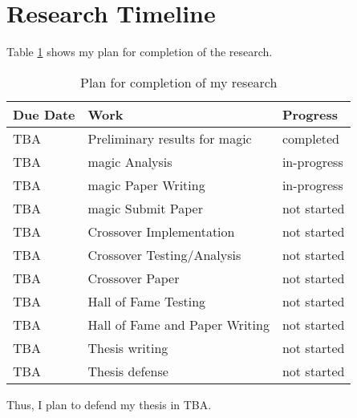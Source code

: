\section{Research Timeline}
\label{timeline}

Table \ref{tab:timeline} shows my plan for completion of the research.

\begin{table}[h]
	\begin{small}
		\begin{center}
			\begin{tabular}{lll}
				Due Date 		& Work 					& Progress\\
				\hline
				TBA 		& Preliminary results for magic & completed\\
				TBA 		& magic Analysis 	& in-progress\\
				TBA 	& magic Paper Writing & in-progress\\
				TBA 	& magic Submit Paper & not started\\
				TBA 	& Crossover Implementation & not started\\
				TBA 	& Crossover Testing/Analysis & not started\\
				TBA 	& Crossover Paper & not started\\
				TBA 	& Hall of Fame Testing & not started\\
				TBA 	& Hall of Fame  and Paper Writing & not started\\
				TBA  	& Thesis writing & not started\\
				TBA 		& Thesis defense & not started\\
			\end{tabular}
		\end{center}
	\end{small}
	\caption{Plan for completion of my research}
	\label{tab:timeline}
\end{table}

Thus, I plan to defend my thesis in TBA.

\pagebreak